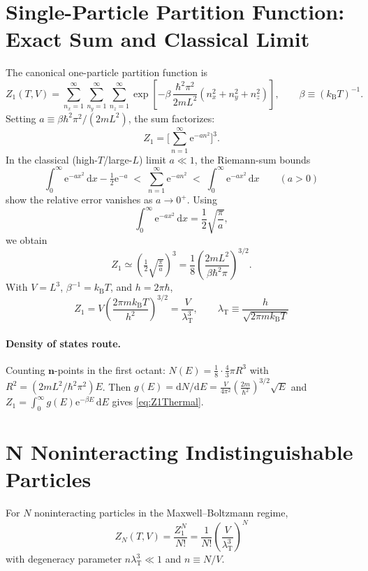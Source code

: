 \documentclass[12pt]{article}
\numberwithin{equation}{section}
\newcommand{\kB}{k_{\mathrm B}}
\newcommand{\lamT}{\lambda_{\mathrm T}}
\newcommand{\dd}{\mathrm d}  %
\newcommand{\ee}{\mathrm e}  %
\begin{document}
\section{Single-Particle Partition Function: Exact Sum and Classical Limit}
The canonical one-particle partition function is
\begin{equation}
Z_1(T,V)=\sum_{n_x=1}^{\infty}\sum_{n_y=1}^{\infty}\sum_{n_z=1}^{\infty}\exp\!\left[-\beta\,\frac{\hbar^2\pi^2}{2mL^2}(n_x^2+n_y^2+n_z^2)\right],\qquad \beta\equiv(\kB T)^{-1}.
\label{eq:Z1sumExact}
\end{equation}
Setting $a\equiv \beta\hbar^2\pi^2/(2mL^2)$, the sum factorizes:
\begin{equation}
Z_1=\Bigg[\sum_{n=1}^{\infty}\ee^{-a n^2}\Bigg]^3.
\label{eq:factor}
\end{equation}
In the classical (high-$T$/large-$L$) limit $a\ll 1$, the Riemann-sum bounds
\begin{equation}
\int_0^{\infty}\ee^{-a x^2}\,\dd x-\tfrac{1}{2}\ee^{-a}
\;<\; \sum_{n=1}^{\infty}\ee^{-a n^2}
\;<\; \int_0^{\infty}\ee^{-a x^2}\,\dd x\qquad(a>0)
\end{equation}
show the relative error vanishes as $a\to0^+$. Using
\begin{equation}
\int_0^{\infty}\ee^{-a x^2}\,\dd x=\frac{1}{2}\sqrt{\frac{\pi}{a}},
\label{eq:halfGaussian}
\end{equation}
we obtain
\begin{equation}
Z_1\simeq\left(\tfrac{1}{2}\sqrt{\tfrac{\pi}{a}}\right)^3=\frac{1}{8}\left(\frac{2mL^2}{\beta\hbar^2\pi}\right)^{3/2}.
\label{eq:Z1a}
\end{equation}
With $V=L^3$, $\beta^{-1}=\kB T$, and $h=2\pi\hbar$,
\begin{equation}
\boxed{\;Z_1=V\left(\frac{2\pi m\kB T}{h^2}\right)^{3/2}=\frac{V}{\lamT^3},\qquad \lamT\equiv\frac{h}{\sqrt{2\pi m\kB T}}\;}
\label{eq:Z1Thermal}
\end{equation}
\paragraph{Density of states route.} Counting $\bm n$-points in the first octant: $N(E)=\tfrac{1}{8}\cdot\tfrac{4}{3}\pi R^3$ with $R^2=(2mL^2/\hbar^2\pi^2)E$. Then $g(E)=\dd N/\dd E=\tfrac{V}{4\pi^2}\left(\tfrac{2m}{\hbar^2}\right)^{3/2}\!\sqrt{E}$ and $Z_1=\int_0^\infty g(E)\ee^{-\beta E}\,\dd E$ gives \cref{eq:Z1Thermal}.

\section{N Noninteracting Indistinguishable Particles}
For $N$ noninteracting particles in the Maxwell--Boltzmann regime,
\begin{equation}
\boxed{\;Z_N(T,V)=\frac{Z_1^N}{N!}=\frac{1}{N!}\left(\frac{V}{\lamT^3}\right)^N\;}
\label{eq:ZNfull}
\end{equation}
with degeneracy parameter $n\lamT^3\ll1$ and $n\equiv N/V$.
\end{document}
